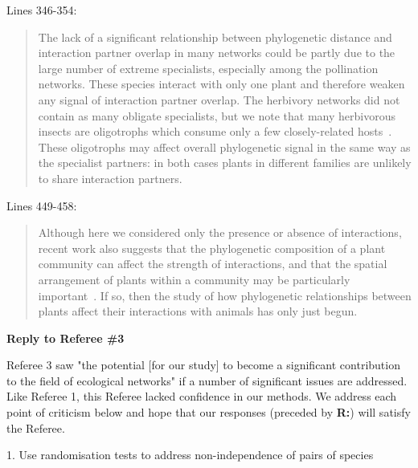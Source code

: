 \documentclass[12pt]{letter}
\begin{document}
      Lines 346-354:

      \begin{quotation}

        The lack of a significant relationship between
        phylogenetic distance and interaction partner overlap in many
        networks could be partly due to the large number of extreme
        specialists, especially among the pollination networks.
        These species interact with only one plant and
        therefore weaken any signal of interaction partner overlap.
        The herbivory networks did not contain as many obligate 
        specialists, but we note that many herbivorous insects are
        oligotrophs which consume only a few closely-related hosts~\citep{Yguel2011,Castagneyrol2014}.
        These oligotrophs may affect overall phylogenetic signal in the same
        way as the specialist partners: in both cases plants in different
        families are unlikely to share interaction partners.

      \end{quotation}


      Lines 449-458:

      \begin{quotation}

        Although here we considered only the presence or absence of interactions,
        recent work also suggests that the phylogenetic composition of a plant
        community can affect the strength of 
        interactions, and that the spatial arrangement of plants within a 
        community may be particularly important~\citep{Yguel2011,Castagneyrol2014}.
        If so, then the study of how phylogenetic relationships between plants
        affect their interactions with animals has only just begun.

      \end{quotation}

\clearpage

{\Large \bf Reply to Referee \#3}
 
  Referee 3 saw "the potential [for our study] to become a significant contribution to the field of ecological networks" if a number of significant issues are addressed. Like Referee 1, this Referee lacked confidence in our methods. We address each point of criticism below and hope that our responses (preceded by \textbf{R:}) will satisfy the Referee.


  1. Use randomisation tests to address non-independence of pairs of species
\end{document}
